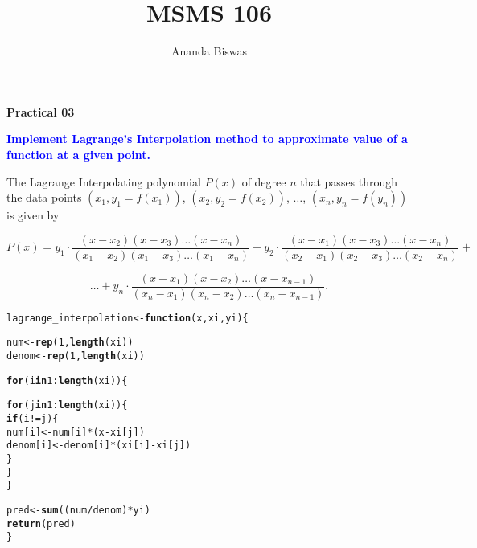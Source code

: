 \documentclass[11pt, a4paper]{article}\usepackage[]{graphicx}\usepackage[]{xcolor}
\title{MSMS 106}
\author{Ananda Biswas}
\date{}
\makeatletter
\newcommand{\hlnum}[1]{\textcolor[rgb]{0.686,0.059,0.569}{#1}}%
\newcommand{\hlopt}[1]{\textcolor[rgb]{0,0,0}{#1}}%
\newcommand{\hldef}[1]{\textcolor[rgb]{0.345,0.345,0.345}{#1}}%
\newcommand{\hlkwa}[1]{\textcolor[rgb]{0.161,0.373,0.58}{\textbf{#1}}}%
\newcommand{\hlkwb}[1]{\textcolor[rgb]{0.69,0.353,0.396}{#1}}%
\newcommand{\hlkwc}[1]{\textcolor[rgb]{0.333,0.667,0.333}{#1}}%
\newcommand{\hlkwd}[1]{\textcolor[rgb]{0.737,0.353,0.396}{\textbf{#1}}}%
\newenvironment{kframe}{%
 \def\at@end@of@kframe{}%
 \ifinner\ifhmode%
  \def\at@end@of@kframe{\end{minipage}}%
  \begin{minipage}{\columnwidth}%
 \fi\fi%
 \def\FrameCommand##1{\hskip\@totalleftmargin \hskip-\fboxsep
 \colorbox{shadecolor}{##1}\hskip-\fboxsep
     \hskip-\linewidth \hskip-\@totalleftmargin \hskip\columnwidth}%
 \MakeFramed {\advance\hsize-\width
   \@totalleftmargin\z@ \linewidth\hsize
   \@setminipage}}%
 {\par\unskip\endMakeFramed%
 \at@end@of@kframe}
\newenvironment{knitrout}{}{} %
\makeatother
\begin{document}
\maketitle

\begin{center}
\textbf{Practical 03}
\end{center}

\smallpencil \hspace{0.5cm} \textcolor{blue}{\textbf{Implement Lagrange's Interpolation method to approximate value of a function at a given point.}}

\vspace{0.5cm}

\faArrowAltCircleRight[regular] \hspace{0.5cm} The Lagrange Interpolating polynomial $P(x)$ of degree $n$ that passes through the data points $(x_1, y_1 = f(x_1))$, $(x_2, y_2 = f(x_2))$, $\ldots$, $(x_n, y_n = f(y_n))$ is given by

$$P(x) = y_1 \cdot \dfrac{(x - x_2)(x - x_3) \ldots (x - x_n)}{(x_1 - x_2) (x_1 - x_3) \ldots (x_1 - x_n)} + y_2 \cdot \dfrac{(x - x_1)(x - x_3) \ldots (x - x_n)}{(x_2 - x_1) (x_2 - x_3) \ldots (x_2 - x_n)} + $$

$$ \ldots + y_n \cdot \dfrac{(x - x_1)(x - x_2) \ldots (x - x_{n-1})}{(x_n - x_1) (x_n - x_2) \ldots (x_n - x_{n-1})}.$$

\vspace{1cm}

\begin{knitrout}
\color{fgcolor}\begin{kframe}
\begin{alltt}
\hldef{lagrange_interpolation} \hlkwb{<-} \hlkwa{function}\hldef{(}\hlkwc{x}\hldef{,} \hlkwc{xi}\hldef{,} \hlkwc{yi}\hldef{)\{}

  \hldef{num} \hlkwb{<-} \hlkwd{rep}\hldef{(}\hlnum{1}\hldef{,} \hlkwd{length}\hldef{(xi))}
  \hldef{denom} \hlkwb{<-} \hlkwd{rep}\hldef{(}\hlnum{1}\hldef{,} \hlkwd{length}\hldef{(xi))}

  \hlkwa{for} \hldef{(i} \hlkwa{in} \hlnum{1}\hlopt{:}\hlkwd{length}\hldef{(xi)) \{}

    \hlkwa{for} \hldef{(j} \hlkwa{in} \hlnum{1}\hlopt{:}\hlkwd{length}\hldef{(xi)) \{}
      \hlkwa{if}\hldef{(i} \hlopt{!=} \hldef{j)\{}
        \hldef{num[i]} \hlkwb{<-} \hldef{num[i]} \hlopt{*} \hldef{(x} \hlopt{-} \hldef{xi[j])}
        \hldef{denom[i]} \hlkwb{<-} \hldef{denom[i]} \hlopt{*} \hldef{(xi[i]} \hlopt{-} \hldef{xi[j])}
      \hldef{\}}
    \hldef{\}}
  \hldef{\}}

  \hldef{pred} \hlkwb{<-} \hlkwd{sum}\hldef{((num} \hlopt{/} \hldef{denom)} \hlopt{*} \hldef{yi)}
  \hlkwd{return}\hldef{(pred)}
\hldef{\}}
\end{alltt}
\end{kframe}
\end{knitrout}
\end{document}
